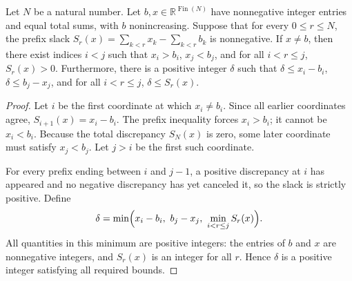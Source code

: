 \begin{helper}
Let \(N\) be a natural number. Let \(b, x \in \mathbb R^{\operatorname{Fin}(N)}\) have nonnegative integer entries and equal total sums, with \(b\) nonincreasing. Suppose that for every \(0 \le r \le N\), the prefix slack \(S_r(x) = \sum_{k < r} x_k - \sum_{k < r} b_k\) is nonnegative. If \(x \neq b\), then there exist indices \(i < j\) such that \(x_i > b_i\), \(x_j < b_j\), and for all \(i < r \le j\), \(S_r(x) > 0\). Furthermore, there is a positive integer \(\delta\) such that \(\delta \le x_i - b_i\), \(\delta \le b_j - x_j\), and for all \(i < r \le j\), \(\delta \le S_r(x)\).
\end{helper}
\begin{proof}
Let \(i\) be the first coordinate at which \(x_i \neq b_i\). Since all earlier coordinates agree, \(S_{i+1}(x) = x_i - b_i\). The prefix inequality forces \(x_i > b_i\); it cannot be \(x_i < b_i\). Because the total discrepancy \(S_N(x)\) is zero, some later coordinate must satisfy \(x_j < b_j\). Let \(j > i\) be the first such coordinate.

For every prefix ending between \(i\) and \(j-1\), a positive discrepancy at \(i\) has appeared and no negative discrepancy has yet canceled it, so the slack is strictly positive. Define
\[
\delta = \min\Bigl(x_i - b_i,\ b_j - x_j,\ \min_{i < r \le j} S_r(x)\Bigr).
\]
All quantities in this minimum are positive integers: the entries of \(b\) and \(x\) are nonnegative integers, and \(S_r(x)\) is an integer for all \(r\). Hence \(\delta\) is a positive integer satisfying all required bounds.
\end{proof}
